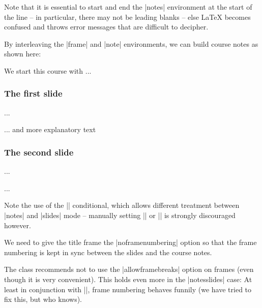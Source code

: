 \begin{dangerbox}
  Note that it is essential to start and end the |notes| environment at the start of the
  line -- in particular, there may not be leading blanks -- else {\LaTeX} becomes confused
  and throws error messages that are difficult to decipher.
\end{dangerbox}

By interleaving the |frame| and |note| environments, we can build course notes as shown
here:

\begin{latexcode}
\ifnotes\maketitle\else
\frame[noframenumbering]\maketitle\fi

\begin{note}
  We start this course with ...
\end{note}

\begin{frame}
  \frametitle{The first slide}
  ...
\end{frame}
\begin{note}
  ... and more explanatory text
\end{note}

\begin{frame}
  \frametitle{The second slide}
  ...
\end{frame}
...
\end{latexcode}

\begin{function}{\ifnotes}
  Note the use of the |\ifnotes| conditional, which allows different treatment between
  |notes| and |slides| mode -- manually setting |\notestrue| or |\notesfalse| is strongly
  discouraged however.
\end{function}
 
\begin{dangerbox}
  We need to give the title frame the |noframenumbering| option so that the frame
  numbering is kept in sync between the slides and the course notes.
\end{dangerbox}

\begin{dangerbox}
  The  class recommends not to use the |allowframebreaks| option on frames
  (even though it is very convenient). This holds even more in the |notesslides| case: At
  least in conjunction with |\newpage|, frame numbering behaves funnily (we have tried to
  fix this, but who knows).
\end{dangerbox}

